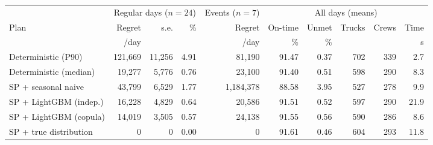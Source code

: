 \begin{tabular}{@{}lrrrrrrrrr@{}}\toprule
 & \multicolumn{3}{c}{Regular days ($n=24$)} & Events ($n=7$) & \multicolumn{5}{c}{All days (means)} \\
\cmidrule(lr){2-4}\cmidrule(lr){5-5}\cmidrule(lr){6-10}
Plan & Regret & s.e. & \% & Regret & On-time & Unmet & Trucks & Crews & Time \\
 & \EUR{}/day & & & \EUR{}/day & \% & \% & & & s \\ \midrule
Deterministic (P90) & 121{,}669 & 11{,}256 & 4.91 & 81{,}190 & 91.47 & 0.37 & 702 & 339 & 2.7 \\
Deterministic (median) & 19{,}277 & 5{,}776 & 0.76 & 23{,}100 & 91.40 & 0.51 & 598 & 290 & 8.3 \\
SP + seasonal naive & 43{,}799 & 6{,}529 & 1.77 & 1{,}184{,}378 & 88.58 & 3.95 & 527 & 278 & 9.9 \\
SP + LightGBM (indep.) & 16{,}228 & 4{,}829 & 0.64 & 20{,}586 & 91.51 & 0.52 & 597 & 290 & 21.9 \\
SP + LightGBM (copula) & 14{,}019 & 3{,}505 & 0.57 & 24{,}138 & 91.55 & 0.56 & 590 & 286 & 8.6 \\
SP + true distribution & 0 & 0 & 0.00 & 0 & 91.61 & 0.46 & 604 & 293 & 11.8 \\
\bottomrule\end{tabular}
